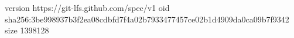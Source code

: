 version https://git-lfs.github.com/spec/v1
oid sha256:3be998937b3f2ea08cdbfd7f4a02b7933477457ce02b1d4909da0ca09b7f9342
size 1398128
